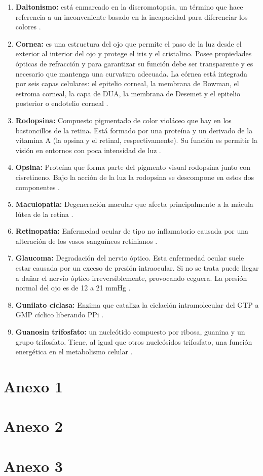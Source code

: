 \documentclass[10pt]{article}
\begin{document}
\begin{enumerate}
\item \textbf{Daltonismo:} está enmarcado en la discromatopsia, un término que hace referencia a un inconveniente basado en la incapacidad para diferenciar los colores \cite{IEEEreferencias:Ref1}. 
\item \textbf{Cornea:} es una estructura del ojo que permite el paso de la luz desde el exterior al interior del ojo y protege el iris y el cristalino. Posee propiedades ópticas de refracción y para garantizar su función debe ser transparente y es necesario que mantenga una curvatura adecuada. La córnea está integrada por seis capas celulares: el epitelio corneal, la membrana de Bowman, el estroma corneal, la capa de DUA, la membrana de Desemet y el epitelio posterior o endotelio corneal \cite{IEEEreferencias:Ref6}.
\item \textbf{Rodopsina:} Compuesto pigmentado de color violáceo que hay en los bastoncillos de la retina. Está formado por una proteína y un derivado de la vitamina A (la opsina y el retinal, respectivamente). Su función es permitir la visión en entornos con poca intensidad de luz \cite{IEEEreferencias:Ref38}.
\item \textbf{Opsina:} Proteína que forma parte del pigmento visual rodopsina junto con cisretineno. Bajo la acción de la luz la rodopsina se descompone en estos dos componentes \cite{IEEEreferencias:Ref39}.
\item \textbf{Maculopatia:} Degeneración macular que afecta principalmente a la mácula lútea de la retina \cite{IEEEreferencias:Ref38}.
\item \textbf{Retinopatia:} Enfermedad ocular de tipo no inflamatorio causada por una alteración de los vasos sanguíneos retinianos \cite{IEEEreferencias:Ref38}.
\item \textbf{Glaucoma:} Degradación del nervio óptico. Esta enfermedad ocular suele estar causada por un exceso de presión intraocular. Si no se trata puede llegar a dañar el nervio óptico irreversiblemente, provocando ceguera. La presión normal del ojo es de 12 a 21 mmHg \cite{IEEEreferencias:Ref38}.
\item \textbf{Gunilato ciclasa:} Enzima que cataliza la ciclación intramolecular del GTP a GMP cíclico liberando PPi \cite{IEEEreferencias:Ref39}.
\item  \textbf{Guanosin trifosfato:} un nucleótido compuesto por ribosa, guanina y un grupo trifosfato. Tiene, al igual que otros nucleósidos trifosfato, una función energética en el metabolismo celular \cite{IEEEreferencias:Ref39}.

\end{enumerate}
\newpage
 
 

\appendix  
\clearpage %
\addappheadtotoc 
\appendixpage 

\section{Anexo 1}
\newpage
\section{Anexo 2}
\newpage
\section{Anexo 3}
\end{document}
